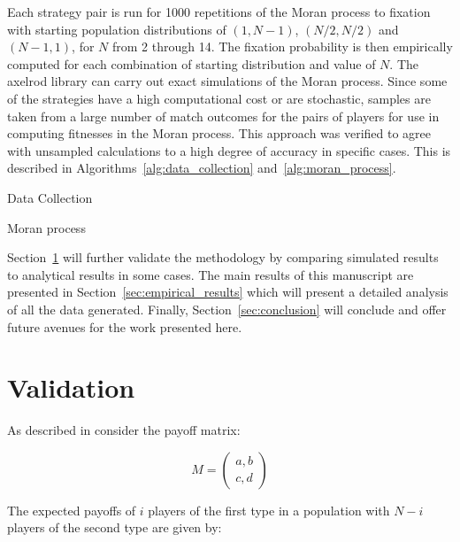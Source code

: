 \documentclass{article}
\begin{document}
Each strategy pair is run for 1000 repetitions of the Moran process to fixation
with starting population distributions of $(1, N-1)$, $(N/2, N/2)$ and $(N-1 ,
1)$, for \(N\) from 2 through 14. The fixation probability is then empirically
computed for each combination of starting distribution and value of \(N\).  The
axelrod library can carry out exact simulations of the Moran process. Since some
of the strategies have a high computational cost or are stochastic, samples are
taken from a large number of match outcomes for the pairs of players for use in
computing fitnesses in the Moran process. This approach was verified to agree
with unsampled calculations to a high degree of accuracy in specific cases.
This is described in Algorithms~\ref{alg:data_collection}
and~\ref{alg:moran_process}.

\begin{algorithm}[!hbtp]
        \caption{Data Collection}
        \label{alg:data_collection}
        
\end{algorithm}

\begin{algorithm}[!hbtp]
        \caption{Moran process}
        \label{alg:moran_process}
        
\end{algorithm}

Section~\ref{sec:validation} will further validate the methodology by comparing
simulated results to analytical results in some cases. The main results of this
manuscript are presented in Section~\ref{sec:empirical_results} which will
present a detailed analysis of all the data generated. Finally,
Section~\ref{sec:conclusion} will conclude and offer future avenues for the work
presented here.


\section{Validation}\label{sec:validation}

As described in \cite{Nowak} consider the payoff matrix:

\begin{equation}\label{equ:payoff_matrix}
    M = \begin{pmatrix}
        a, b\\
        c, d
        \end{pmatrix}
\end{equation}

The expected payoffs of \(i\) players of the first type in a population with \(N
- i\) players of the second type are given by:
\end{document}
